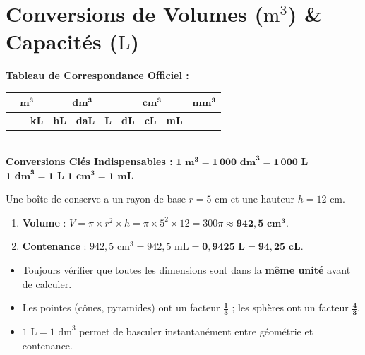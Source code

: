 \section{Conversions de Volumes ($\text{m}^3$) \& Capacités ($\text{L}$)}

\begin{center}
\begin{tcolorbox}[colback=white, colframe=colPrimary, width=0.98\linewidth, arc=4pt, boxrule=1pt, top=4pt, bottom=4pt, left=4pt, right=4pt]
\centering\sffamily\footnotesize
\textbf{Tableau de Correspondance Officiel :} \\[3pt]
\begin{tabular}{|c|c|c|c|c|c|c|c|c|c|c|c|}
\hline
\multicolumn{3}{|c|}{$\mathbf{m^3}$} & \multicolumn{3}{c|}{$\mathbf{dm^3}$} & \multicolumn{3}{c|}{$\mathbf{cm^3}$} & \multicolumn{3}{c|}{$\mathbf{mm^3}$} \\ \hline
& & \textbf{kL} & \textbf{hL} & \textbf{daL} & \textbf{L} & \textbf{dL} & \textbf{cL} & \textbf{mL} & & & \\ \hline
\end{tabular}
\\[4pt]
\textbf{Conversions Clés Indispensables :} \quad 
$\mathbf{1\text{ m}^3 = 1\,000\text{ dm}^3 = 1\,000\text{ L}}$ \qquad 
$\mathbf{1\text{ dm}^3 = 1\text{ L}}$ \qquad 
$\mathbf{1\text{ cm}^3 = 1\text{ mL}}$
\end{tcolorbox}
\end{center}

\begin{cadremethode}
Une boîte de conserve a un rayon de base $r = 5\text{ cm}$ et une hauteur $h = 12\text{ cm}$.
\begin{enumerate}[leftmargin=1.5em, itemsep=1pt]
    \item \textbf{Volume} : $V = \pi \times r^2 \times h = \pi \times 5^2 \times 12 = 300\pi \approx \mathbf{942{,}5\text{ cm}^3}$.
    \item \textbf{Contenance} : $942{,}5\text{ cm}^3 = 942{,}5\text{ mL} = \mathbf{0{,}9425\text{ L}} = \mathbf{94{,}25\text{ cL}}$.
\end{enumerate}
\end{cadremethode}

\begin{cadreretenu}
\begin{itemize}[leftmargin=1.5em, itemsep=1pt]
    \item Toujours vérifier que toutes les dimensions sont dans la \textbf{même unité} avant de calculer.
    \item Les pointes (cônes, pyramides) ont un facteur $\mathbf{\frac{1}{3}}$ ; les sphères ont un facteur $\mathbf{\frac{4}{3}}$.
    \item $1\text{ L} = 1\text{ dm}^3$ permet de basculer instantanément entre géométrie et contenance.
\end{itemize}
\end{cadreretenu}

